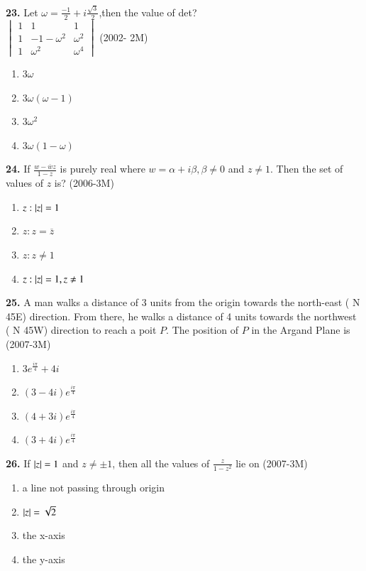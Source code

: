 \documentclass[journal,12pt,twocolumn]{IEEEtran}
\theoremstyle{remark}
\begin{document}
\textbf{23.} Let $\omega=\frac{-1}{2}+i\frac{\sqrt{3}}{2}$,then the value of det?\\
$\begin{vmatrix}	1 & 1 & 1\\
	1 & -1-\omega^{2} & \omega^{2}\\
	1 & \omega^{2} & \omega^{4}

 \end{vmatrix}$ 
\hfill{(2002- 2M)}
\begin{enumerate}[label=(\alph*)]
	\item $3\omega$
	\item $3\omega(\omega-1)$
	\item $3\omega^{2}$
	\item $3\omega(1-\omega)$
\end{enumerate}
\textbf{24.} If $\frac{w-\overline{w}z}{1-z}$ is purely real where $w=\alpha+i\beta, \beta \neq 0$ and $z \neq 1$. Then the set of values of $z$ is? \hfill{(2006-3M)}
\begin{enumerate}[label=(\alph*)]
	\item {$z:\abs{z}=1$}
	\item {$z:z= \overline{z}$}
	\item {$z:z \neq 1 $}
	\item {$z:\abs{z}=1, z\neq1$}
\end{enumerate}
\textbf{25.} A man walks a distance of 3 units from the origin towards the north-east ( N 45\degree E) direction. From there, he walks a distance of 4 units towards the northwest ( N 45\degree W) direction to reach a poit $P$. The position of $P$ in the Argand Plane is \hfill{(2007-3M)}
\begin{enumerate}[label=(\alph*)]
	\item $3e^{\frac{i\pi}{4}}+4i$
	\item $(3-4i)e^{\frac{i\pi}{4}}$
	\item $(4+3i)e^{\frac{i\pi}{4}}$
	\item $(3+4i)e^{\frac{i\pi}{4}}$
\end{enumerate}
\textbf{26.} If $\abs{z}=1$ and $z\neq\pm1$, then all the values of $\frac{z}{1-z^{2}}$ lie on \hfill{(2007-3M)}
\begin{enumerate}[label=(\alph*)]
	\item a line not passing through origin
	\item $\abs{z}=\sqrt{2}$
	\item the x-axis
	\item the y-axis
\end{enumerate}
\end{document}
